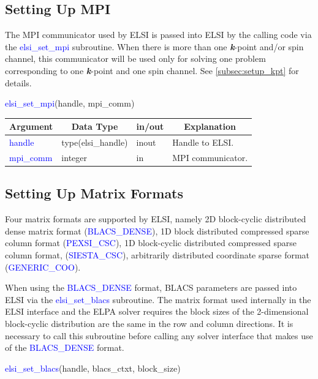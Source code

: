 \documentclass{report}
\begin{document}
\subsection{Setting Up MPI}
\label{subsec:setup_mpi}
The MPI communicator used by ELSI is passed into ELSI by the calling code via the \textcolor{blue}{elsi\_set\_mpi} subroutine. When there is more than one \textbf{\textit{k}}-point and/or spin channel, this communicator will be used only for solving one problem corresponding to one \textbf{\textit{k}}-point and one spin channel. See \ref{subsec:setup_kpt} for details.
\begin{labeling}{\hspace{6cm}}
\item [\hspace{0.3cm} \textcolor{blue}{elsi\_set\_mpi}(handle, mpi\_comm)]
\end{labeling}

\begin{tabular}[]{|p{30mm}|p{30mm}|p{15mm}|p{90mm}|}
\hline
\multicolumn{1}{|c|}{\textbf{Argument}} & \multicolumn{1}{c|}{\textbf{Data Type}} & \multicolumn{1}{c|}{\textbf{in/out}} & \multicolumn{1}{c|}{\textbf{Explanation}}\\
\hline
\textcolor{blue}{handle}    & type(elsi\_handle) & inout & Handle to ELSI.\\
\hline
\textcolor{blue}{mpi\_comm} & integer            & in    & MPI communicator.\\
\hline
\end{tabular}

\subsection{Setting Up Matrix Formats}
\label{subsec:setup_matrix}
Four matrix formats are supported by ELSI, namely 2D block-cyclic distributed dense matrix format (\textcolor{blue}{BLACS\_DENSE}), 1D block distributed compressed sparse column format (\textcolor{blue}{PEXSI\_CSC}), 1D block-cyclic distributed compressed sparse column format, (\textcolor{blue}{SIESTA\_CSC}), arbitrarily distributed coordinate sparse format (\textcolor{blue}{GENERIC\_COO}).

When using the \textcolor{blue}{BLACS\_DENSE} format, BLACS parameters are passed into ELSI via the \textcolor{blue}{elsi\_set\_blacs} subroutine. The matrix format used internally in the ELSI interface and the ELPA solver requires the block sizes of the 2-dimensional block-cyclic distribution are the same in the row and column directions. It is necessary to call this subroutine before calling any solver interface that makes use of the \textcolor{blue}{BLACS\_DENSE} format.
\begin{labeling}{\hspace{6cm}}
\item [\hspace{0.3cm} \textcolor{blue}{elsi\_set\_blacs}(handle, blacs\_ctxt, block\_size)]
\end{labeling}
\end{document}
